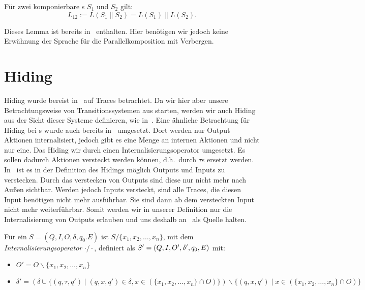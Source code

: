 \begin{lem}
  \label{LemmaSprache}
  Für zwei komponierbare \EIO{}s $S_1$ und $S_2$ gilt: \[L_{12} := L(S_1\|S_2) =
  L(S_1)\|L(S_2).\]
\end{lem}

Dieses Lemma ist bereits in~\cite{Vogler2014EIO} enthalten. Hier benötigen wir
jedoch keine Erwähnung der Sprache für die Parallelkomposition mit Verbergen.

\section{Hiding}

Hiding wurde bereist in~\cite{Chilton2013} auf Traces betrachtet. Da wir hier
aber unsere Betrachtungsweise von Transitionssystemen aus starten, werden
wir auch Hiding aus der Sicht dieser Systeme definieren, wie
in~\cite{Schlosser2012BA}. Eine ähnliche Betrachtung für Hiding bei \EIO{}s
wurde auch bereits in~\cite{Lynch1996} umgesetzt. Dort werden nur Output
Aktionen internalisiert, jedoch gibt es eine Menge an internen Aktionen und
nicht nur eine. Das Hiding wir durch einen Internalisierungsoperator
umgesetzt. Es sollen dadurch Aktionen versteckt werden können, d.h.\ durch
$\tau$s ersetzt werden. In~\cite{Chilton2013} ist es in der Definition des
Hidings möglich Outputs und Inputs zu verstecken. Durch das verstecken von
Outputs sind diese nur nicht mehr nach Außen sichtbar. Werden jedoch Inputs
versteckt, sind alle Traces, die diesen Input benötigen nicht mehr ausführbar.
Sie sind dann ab dem versteckten Input nicht mehr weiterführbar. Somit werden
wir in unserer Definition nur die Internalisierung von Outputs erlauben und uns
deshalb an~\cite{Schlosser2012BA} als Quelle halten.

\begin{Def}[Internalisierungsoperator]
  Für ein \EIO{} $S=(Q,I,O,\delta ,q_0.E)$ ist $S/\{x_1,x_2,\dots ,x_n\}$, mit
  dem \emph{Internalisierungsoperator} $\cdot /\cdot$, definiert als
  $S'=(Q,I,O',\linebreak\delta ',q_0,E)$ mit:
  \begin{itemize}
    \item $O'=O\backslash \{x_1,x_2,\dots ,x_n\}$
    \item $\delta '=(\delta\cup\{(q,\tau ,q')\mid (q,x,q')\in\delta
      ,x\in(\{x_1,x_2,\dots ,x_n\}\cap O)\})\backslash \{(q,x,q')\mid
      x\in(\{x_1,x_2,\dots ,x_n\}\cap O)\}$
  \end{itemize}
\end{Def}

